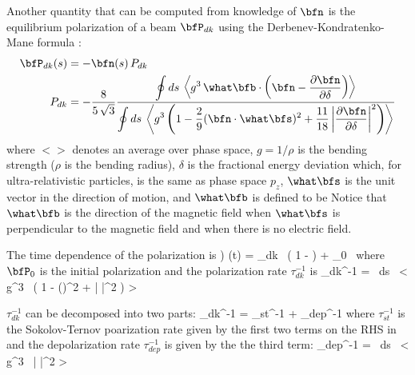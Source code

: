 {Another quantity that can be computed from knowledge of $\bfn$ is the equilibrium polarization of a beam
$\bfP_{dk}$ using the Derbenev-Kondratenko-Mane formula \cite{b:barber99}:
\begin{align}
  \bfP_{dk}(s) &= -\bfn(s) \, P_{dk} \\
  P_{dk} &= -\frac{8}{5 \, \sqrt{3}}
  \frac{\displaystyle \oint ds \,\left< g^3 \, \what\bfb \cdot 
    \left( \bfn - \frac{\partial \bfn}{\partial \delta} \right) \right>}
  {\displaystyle \oint ds \, \left< g^3 \left( 1 - \frac{2}{9} (\bfn \cdot \what\bfs)^2 + 
    \frac{11}{18} \left| \frac{\partial \bfn}{\partial \delta} \right|^2 \right) \right>}
    \nonumber
\end{align}
where $<>$ denotes an average over phase space, $g = 1/\rho$ is the bending
strength ($\rho$ is the bending radius), $\delta$ is the fractional energy deviation which, for
ultra-relativistic particles, is the same as phase space $p_z$, $\what\bfs$ is the unit vector in
the direction of motion, and $\what\bfb$ is defined to be
\Begineq
  \what\bfb \equiv {}
\Endeq
Notice that $\what\bfb$ is the direction of the magnetic field when $\what\bfs$ is perpendicular to
the magnetic field and when there is no electric field.

The time dependence of the polarization is \cite{b:barber99})
\Begineq
  \bfP(t) = \bfP_{dk} \, \left( 1 -  \right) + \bfP_0 \, 
\Endeq
where $\bfP_0$ is the initial polarization and the polarization rate $\tau_{dk}^{-1}$ is 
\Begineq
  \tau_{dk}^{-1} =  
   \, \oint ds \, \left< g^3 \, \left( 1 -  (\bfn \cdot \what\bfs)^2 + 
   \left| \frac{\partial \bfn}{\partial \delta} \right|^2 \right) \right>
  \label{t583}
\Endeq

$\tau_{dk}^{-1}$ can be decomposed into two parts:
\Begineq
  \tau_{dk}^{-1} = \tau_{st}^{-1} + \tau_{dep}^{-1}
  \label{tdk}
\Endeq
where $\tau_{st}^{-1}$ is the Sokolov-Ternov poarization rate given by the first two terms on the
RHS in  and the depolarization rate $\tau_{dep}^{-1}$ is given by the the third term:
\Begineq
  \tau_{dep}^{-1} =  
   \, \oint ds \, \left< g^3 \,
   \left| \frac{\partial \bfn}{\partial \delta} \right|^2 \right>
  \label{tdep}
\Endeq

}
